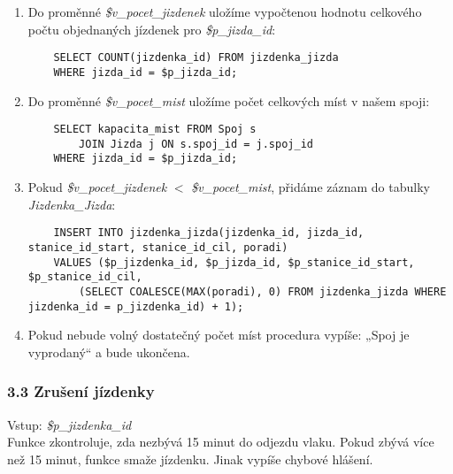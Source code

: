 \documentclass[11pt]{article}
\begin{document}
\begin{enumerate}
    \item Do proměnné \textit{\$v\_pocet\_jizdenek} uložíme vypočtenou hodnotu celkového počtu objednaných jízdenek pro \textit{\$p\_jizda\_id}:
    \begin{lstlisting}
    SELECT COUNT(jizdenka_id) FROM jizdenka_jizda
    WHERE jizda_id = $p_jizda_id;
    \end{lstlisting}

    \item Do proměnné \textit{\$v\_pocet\_mist} uložíme počet celkových míst v našem spoji:
    \begin{lstlisting}
    SELECT kapacita_mist FROM Spoj s
        JOIN Jizda j ON s.spoj_id = j.spoj_id
    WHERE jizda_id = $p_jizda_id;
    \end{lstlisting}

    \item Pokud \textit{\$v\_pocet\_jizdenek} $<$ \textit{\$v\_pocet\_mist}, přidáme záznam do tabulky \textit{Jizdenka\_Jizda}:
    \begin{lstlisting}
    INSERT INTO jizdenka_jizda(jizdenka_id, jizda_id, stanice_id_start, stanice_id_cil, poradi)
    VALUES ($p_jizdenka_id, $p_jizda_id, $p_stanice_id_start, $p_stanice_id_cil, 
        (SELECT COALESCE(MAX(poradi), 0) FROM jizdenka_jizda WHERE jizdenka_id = p_jizdenka_id) + 1);
    \end{lstlisting}

    \item Pokud nebude volný dostatečný počet míst procedura vypíše: „Spoj je vyprodaný“ a bude ukončena.
\end{enumerate}


\subsubsection*{3.3 Zrušení jízdenky}
Vstup: \textit{\$p\_jizdenka\_id}\\
Funkce zkontroluje, zda nezbývá 15 minut do odjezdu vlaku. Pokud zbývá více než 15 minut, funkce smaže jízdenku. Jinak vypíše chybové hlášení.
\end{document}
